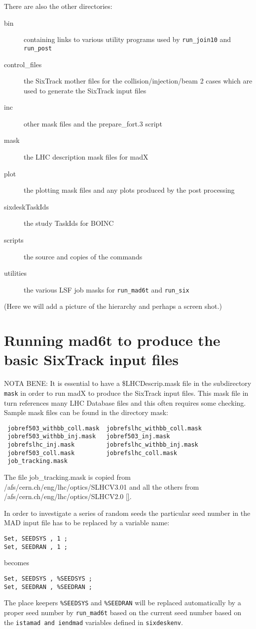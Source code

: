 \documentclass{cernatsnote}    %
\begin{document}
There are also the other directories:
\begin{description}
\item [bin] containing links to various utility programs used by {\tt run\_join10}
and {\tt run\_post}
\item [control\_files] the SixTrack mother files for the collision/injection/beam 2
cases which are used to generate the SixTrack input files
\item [inc] other mask files and the prepare\_fort.3 script
\item [mask] the LHC description mask files for madX 
\item [plot] the plotting mask files and any plots produced by the post processing
\item [sixdeskTaskIds] the study TaskIds for BOINC 
\item [scripts] the source and copies of the commands
\item [utilities] the various LSF job masks for {\tt run\_mad6t} and {\tt run\_six}  
\end{description}
(Here we will add a picture of the hierarchy and perhaps a screen shot.)
\section{Running mad6t to produce the basic SixTrack input files}
\label{sec:mad_6t}
NOTA BENE: It is essential to have a \$LHCDescrip.mask file
in the subdirectory {\tt mask} in order to run madX to produce
the SixTrack input files. This mask file in turn references many
LHC Database files and this often requires some checking.
Sample mask files can be found in the directory mask:
\begin{verbatim}
 jobref503_withbb_coll.mask  jobrefslhc_withbb_coll.mask  
 jobref503_withbb_inj.mask   jobref503_inj.mask        
 jobrefslhc_inj.mask         jobrefslhc_withbb_inj.mask
 jobref503_coll.mask         jobrefslhc_coll.mask        
 job_tracking.mask
\end{verbatim}
The file job\_tracking.mask is copied from
/afs/cern.ch/eng/lhc/optics/SLHCV3.01 and all the
others from /afs/cern.ch/eng/lhc/optics/SLHCV2.0 \ref{}.

In order to investigate a
series of random seeds the particular seed number in the MAD input
file has to be replaced by a variable name:
\begin{verbatim}
Set, SEEDSYS , 1 ;
Set, SEEDRAN , 1 ;
\end{verbatim}
becomes
\begin{verbatim}
Set, SEEDSYS , %SEEDSYS ;
Set, SEEDRAN , %SEEDRAN ;
\end{verbatim}
The place keepers {\tt \%SEEDSYS} and {\tt \%SEEDRAN} will be replaced
automatically by a proper seed number by {\tt run\_mad6t} based on the
current seed number based on the {\tt istamad and iendmad} variables
defined in {\tt sixdeskenv}. 
\end{document}
